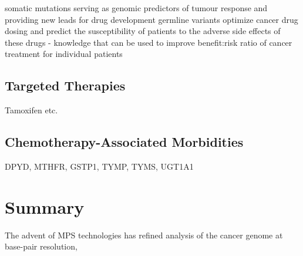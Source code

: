 somatic mutations serving as genomic predictors of tumour response and providing new leads for drug development
germline variants optimize cancer drug dosing and predict the susceptibility of patients to the adverse side effects of these drugs - knowledge that can be used to improve benefit:risk ratio of cancer treatment for individual patients

\subsection{Targeted Therapies}
Tamoxifen etc.

\subsection{Chemotherapy-Associated Morbidities}
DPYD, MTHFR, GSTP1, TYMP, TYMS, UGT1A1

\section{Summary}
\label{sec:Summary}

The advent of MPS technologies has refined analysis of the cancer genome at base-pair resolution,

\endinput

Key words: pharmacogenomic, germline variants, targeted amplicon-based MPS panel, formalin artifacts, tumour-only genomic profiling, patient care, treatment outcome, treatment response, risk stratification, susceptibility, toxicity, adverse drug events

Genetic variants in genes encoding drug metabolizing enzymes, drug transporters, and drug targets can cause interpatient differences in drug response. Pharmacogenomics (PGx) applies genomic approaches to evaluate the association of genetic variants with drug efficacy and toxicity. If a PGx variant demonstrates clinical utility, screening for this biomarker would guide treatment selection as well as optimization of treatment dosage and duration, thereby improving therapeutic effectiveness and safety. In the context of cancer, both somatic mutations in the tumour genome and germline genetic variants can influence a patient's treatment choice. While somatic mutations typically affect activity or expression of drug targets, germline variants present in normal tissues affect drug disposition which includes absorption, distribution, metabolism, and excretion of the administered drug. Although somatic mutations have been implicated in cancer PGx, this thesis will focus on germline PGx variants with significant impacts on treatment response to cytotoxic chemotherapy.

